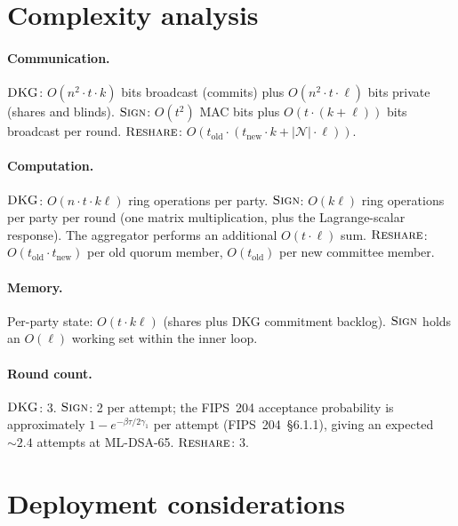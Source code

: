 \documentclass[11pt,a4paper]{article}
\theoremstyle{definition}
\theoremstyle{remark}
\newcommand{\Sign}{\textsc{Sign}}
\newcommand{\DKG}{\textsc{DKG}}
\newcommand{\Reshare}{\textsc{Reshare}}
\begin{document}
\section{Complexity analysis}
\label{sec:complexity}

\paragraph{Communication.}
$\DKG$: $O(n^2 \cdot t \cdot k)$ bits broadcast (commits) plus
$O(n^2 \cdot t \cdot \ell)$ bits private (shares and blinds).
$\Sign$: $O(t^2)$ MAC bits plus $O(t \cdot (k + \ell))$ bits
broadcast per round. $\Reshare$: $O(t_{\mathrm{old}} \cdot
(t_{\mathrm{new}} \cdot k + |\mathcal{N}| \cdot \ell))$.

\paragraph{Computation.}
$\DKG$: $O(n \cdot t \cdot k\ell)$ ring operations per party.
$\Sign$: $O(k\ell)$ ring operations per party per round (one matrix
multiplication, plus the Lagrange-scalar response). The aggregator
performs an additional $O(t \cdot \ell)$ sum.
$\Reshare$: $O(t_{\mathrm{old}} \cdot t_{\mathrm{new}})$ per old quorum
member, $O(t_{\mathrm{old}})$ per new committee member.

\paragraph{Memory.}
Per-party state: $O(t \cdot k\ell)$ (shares plus DKG commitment
backlog). $\Sign$ holds an $O(\ell)$ working set within the inner
loop.

\paragraph{Round count.}
$\DKG$: 3. $\Sign$: 2 per attempt; the FIPS~204 acceptance
probability is approximately $1 - e^{-\beta\tau/2\gamma_1}$ per
attempt (FIPS~204~\S6.1.1), giving an expected $\sim 2.4$ attempts at
ML-DSA-65. $\Reshare$: 3.

\section{Deployment considerations}
\label{sec:deployment}
\end{document}
